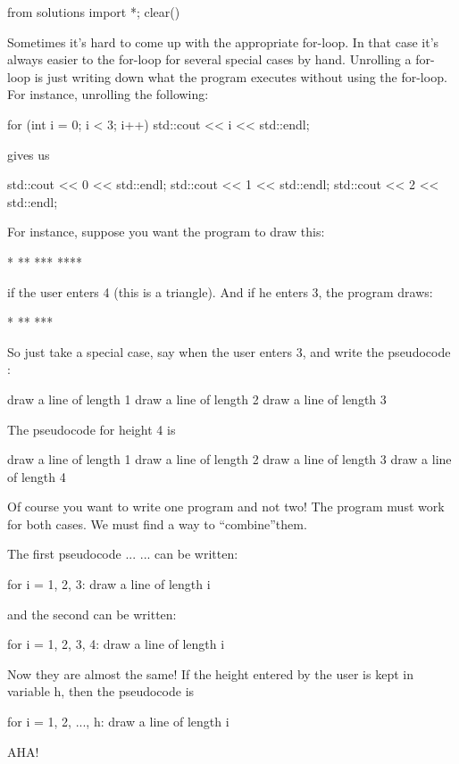 \begin{python0}
from solutions import *; clear()
\end{python0}

Sometimes it's hard to come up with the appropriate for-loop. In that case it's always easier to  the for-loop for several special cases by hand. Unrolling a for-loop is just writing down what the program executes without using the for-loop. For instance, unrolling the following:
\begin{console}
for (int i = 0; i < 3; i++)
{   
    std::cout << i << std::endl;
}

gives us
\begin{console}
std::cout << 0 << std::endl;
std::cout << 1 << std::endl;
std::cout << 2 << std::endl;
\end{console}
For instance, suppose you want the program to draw this:
\begin{console}
*
**
***
****
\end{console}
if the user enters 4 (this is a triangle). And if he enters 3, the
program draws:
\begin{console}
*
**
***
\end{console}
So just take a special case, say when the user enters 3, and write the
pseudocode :
\begin{console}
draw a line of length 1
draw a line of length 2
draw a line of length 3
\end{console}
The pseudocode for height 4 is
\begin{console}
draw a line of length 1
draw a line of length 2
draw a line of length 3
draw a line of length 4
\end{console}
Of course you want to write one program and not two! The program must
work for both cases. We must find a way to ``combine''them.

The first pseudocode ...  ... can be written:
\begin{console}
for i = 1, 2, 3:
           draw a line of length i
\end{console}
and the second can be written:
\begin{console}
for i = 1, 2, 3, 4:
           draw a line of length i
\end{console}

Now they are almost the same! If the height entered by the user is kept
in variable h, then the pseudocode is
\begin{console}
for i = 1, 2, ..., h:
           draw a line of length i
\end{console}
AHA! 


\end{console}
